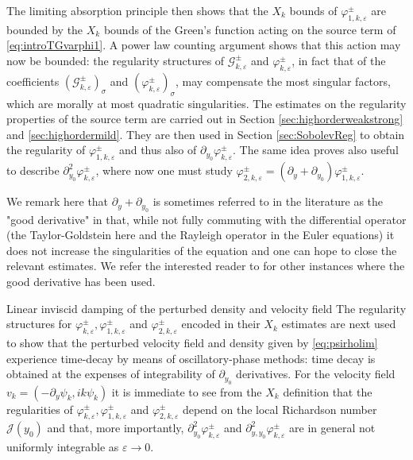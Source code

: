 \documentclass[11pt,reqno]{amsproc}
\makeatletter
\renewcommand\subsection{\@startsection{subsection}{2}%
\normalparindent{.5\linespacing\@plus.7\linespacing}{-.5em}
{\normalfont\bfseries}}
\theoremstyle{definition}
\numberwithin{equation}{section}
\newcommand{\G}{{\mathcal{G}}}
\newcommand{\cJ}{{\mathcal{J}}}
\newcommand{\ep}{\varepsilon}
\makeatother
\begin{document}
The limiting absorption principle then shows that the $X_k$ bounds of $\varphi_{1,k,\ep}^\pm$ are bounded by the $X_k$ bounds of the Green's function acting on the source term of \eqref{eq:introTGvarphi1}. A power law counting argument shows that this action may now be bounded: the regularity structures of $\G_{k,\ep}^\pm$ and $\varphi_{k,\ep}^\pm$, in fact that of the coefficients $( \G_{k,\ep}^\pm )_\sigma$ and  $( \varphi_{k,\ep}^\pm )_\sigma$, may compensate the most singular factors, which are morally at most quadratic singularities. The estimates on the regularity properties  of the source term are carried out in Section \ref{sec:highorderweakstrong} and \ref{sec:highordermild}. They are then used in Section \ref{sec:SobolevReg} to obtain the regularity of $\varphi_{1,k,\ep}^\pm$ and thus also of $\partial_{y_0}\varphi_{k,\ep}^\pm$. The same idea proves also useful to describe $\partial_{y_0}^2\varphi_{k,\ep}^\pm$, where now one must study $\varphi_{2,k,\ep}^\pm = (\partial_y + \partial_{y_0})\varphi_{1,k,\ep}^\pm$. 

We remark here that $\partial_y+\partial_{y_0}$ is sometimes referred to in the literature as the "good derivative" in that, while not fully commuting with the differential operator (the Taylor-Goldstein here and the Rayleigh operator in the Euler equations) it does not increase the singularities of the equation and one can hope to close the relevant estimates. We refer the interested reader to \cites{BCZV19, WZZ18, WZZ19, WZZKolmo20, IJ22, IIJ22} for other instances where the good derivative has been used.




\subsection{Linear inviscid damping of the perturbed density and velocity field}
The regularity structures for $\varphi_{k,\ep}^\pm, \varphi_{1,k,\ep}^\pm$ and $\varphi_{2,k,\ep}^\pm$ encoded in their $X_k$ estimates are next used to show that the perturbed velocity field and density given by \eqref{eq:psirholim} experience time-decay by means of oscillatory-phase methods: time decay is obtained at the expenses of integrability of $\partial_{y_0}$ derivatives. For the velocity field $v_k=(-\partial_y\psi_k,ik\psi_k)$ it is immediate to see from the $X_k$ definition that the regularities of $\varphi_{k,\ep}^\pm, \varphi_{1,k,\ep}^\pm$ and $\varphi_{2,k,\ep}^\pm$ depend on the local Richardson number $\cJ(y_0)$ and that, more importantly, $\partial_{y_0}^2\varphi_{k,\ep}^\pm$ and $\partial_{y,y_0}^2\varphi_{k,\ep}^\pm$ are in general not uniformly integrable as $\ep\rightarrow 0$. 
\end{document}
